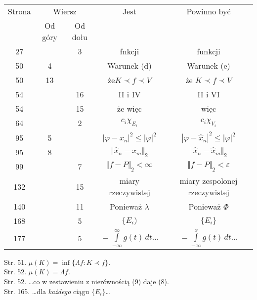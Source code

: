 \documentclass[a4paper,11pt]{article}
\begin{document}
\begin{center}

  \begin{tabular}{|c|c|c|c|c|}
    \hline
    Strona & \multicolumn{2}{c|}{Wiersz} & Jest
                              & Powinno być \\ \cline{2-3}
    & Od góry & Od dołu & & \\
    \hline
    27  & & \hphantom{0}3 & fnkcji & funkcji \\
    50  & \hphantom{0}4 &  & Warunek (d) & Warunek (e) \\
    50  & 13 &  & że$K \prec f  \prec V$ & że $K \prec f  \prec V$ \\
    54  & & 16 & II i IV & II i VI \\
    54  & & 15 & że więc & więc \\
    64  & & \hphantom{0}2 & $c_{ i } \chi_{ E_{ i } }$ & $c_{ i } \chi_{ V_{ i } }$ \\
    95  & \hphantom{0}5 & & $| \varphi - x_{ n } |^{ 2 } \leq | \varphi |^{ 2 }$
           & $| \varphi - \hat{ x }_{ n } |^{ 2 } \leq | \varphi |^{ 2 }$ \\
    95  & \hphantom{0}8 & & $\Vert \hat{ x }_{ n } - x_{ m } \Vert_{ 2 }$
           & $\Vert \hat{ x }_{ n } - \hat{ x }_{ m } \Vert_{ 2 }$ \\
    99  & & \hphantom{0}7 & $\Vert f - P \Vert_{ 2 } < \infty$
           & $\Vert f - P \Vert_{ 2 } < \varepsilon$ \\
    132 & & 15 & miary rzeczywistej & miary zespolonej rzeczywistej \\
    140 & & 11 & Ponieważ $\lambda$ & Ponieważ $\Phi$ \\
    168 & & \hphantom{0}5 & $\{ E_{ i } )$ & $\{ E_{ i } \}$ \\
    177 & & \hphantom{0}5 & $= \int\limits^{ \infty }_{ -\infty } g( t ) \, dt \ldots$
           & $= \int\limits^{ x }_{ -\infty } g( t ) \, dt \ldots$ \\
    \hline
  \end{tabular}

\end{center}

\vspace{\spaceTwo}


Str. 51. $\mu( K ) = \inf\{ \Lambda f : K \prec f \}$. \\
Str. 52. $\mu( K ) = \Lambda f$. \\
Str. 52. \ldots co w zestawieniu z nierównością (9) daje (8). \\
Str. 165. \ldots dla \textit{każdego} ciągu $\{ E_{ i } \}$\ldots
\end{document}
